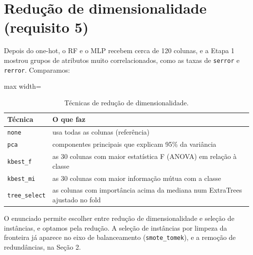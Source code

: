 \documentclass[11pt,a4paper]{article}
\begin{document}
\section{Redução de dimensionalidade (requisito 5)}

Depois do one-hot, o RF e o MLP recebem cerca de 120 colunas, e a Etapa 1 mostrou grupos de atributos muito correlacionados, como as taxas de \texttt{serror} e \texttt{rerror}. Comparamos:

\begin{table}[H]
\centering
\caption{Técnicas de redução de dimensionalidade.}
\begin{adjustbox}{max width=\linewidth}
\begin{tabular}{lp{11cm}}
\toprule
Técnica & O que faz \\
\midrule
\texttt{none} & usa todas as colunas (referência) \\
\texttt{pca} & componentes principais que explicam 95\% da variância \\
\texttt{kbest\_f} & as 30 colunas com maior estatística F (ANOVA) em relação à classe \\
\texttt{kbest\_mi} & as 30 colunas com maior informação mútua com a classe \\
\texttt{tree\_select} & as colunas com importância acima da mediana num ExtraTrees ajustado no fold \\
\bottomrule
\end{tabular}
\end{adjustbox}
\end{table}

O enunciado permite escolher entre redução de dimensionalidade e seleção de instâncias, e optamos pela redução. A seleção de instâncias por limpeza da fronteira já aparece no eixo de balanceamento (\texttt{smote\_tomek}), e a remoção de redundâncias, na Seção 2.
\end{document}
